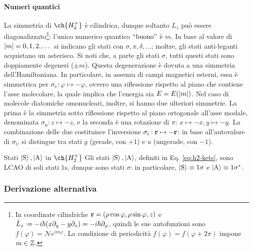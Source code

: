 \paragraph{Numeri quantici}

La simmetria di $ \ch{H_2^+} $ è cilindrica, dunque soltanto $ L_z $ può essere diagonalizzato\footnote{In coordinate cilindriche $ \mathbf{r} = (\rho \cos \varphi, \rho \sin \varphi, z) $ e $ \hat{L}_z \defeq -i\hbar (x \pa_y - y \pa_x) = -i \hbar \pa_\varphi $, quindi le sue autofunzioni sono $ f(\varphi) = \mathcal{N} e^{i m \varphi} $. La condizione di periodicità $ f(\varphi) = f(\varphi + 2\pi) $ impone $ m \in \mathbb{Z} $.}: l'unico numerico quantico $ ``\text{buono}" $ è $ m $. In base al valore di $ \left\lvert m\right\rvert = 0, 1, 2, \dots $ si indicano gli stati con $ \sigma, \pi, \delta, \dots $; inoltre, gli stati anti-leganti acquistano un asterisco. Si noti che, a parte gli stati $ \sigma $, tutti questi stati sono doppiamente degeneri ($ \pm m $). Questa degenerazione è dovuta a una simmetria dell'Hamiltoniana. In particolare, in assenza di campi magnetici esterni, essa è simmetrica per $ \sigma_\text{v} : \varphi \mapsto -\varphi $, ovvero una riflessione rispetto al piano che contiene l'asse molecolare, la quale implica che l'energia sia $ E = E(\left\lvert m\right\rvert) $. Nel caso di molecole diatomiche omonucleari, inoltre, si hanno due ulteriori simmetrie. La prima è la simmetria sotto riflessione rispetto al piano ortogonale all'asse modale, denominata $\sigma_\text{n}: z \mapsto -z$, e la seconda è una rotazione di $\pi$: $x \mapsto -x, y \mapsto -y$. La combinazione delle due costituisce l'inversione $ \sigma_\text{i} : \mathbf{r} \mapsto -\mathbf{r}$: in base all'autovalore di $ \sigma_\text{i} $, si distingue tra stati $ g $ (gerade, con $ +1 $) e $ u $ (ungerade, con $ -1 $).

\begin{example}{Stati $ \ket{\text{S}},\ket{\text{A}} $ in $ \ch{H_2^+} $}{}
	Gli stati $ \ket{\text{S}},\ket{\text{A}} $, definiti in Eq. \ref{eq:h2-kets}, sono LCAO di soli stati $ \text{1s} $, dunque sono stati $ \sigma $: in particolare, $ \ket{\text{S}} \equiv 1\sigma $ e $ \ket{\text{A}} \equiv 1\sigma^* $.
\end{example}



\subsubsection{Derivazione alternativa}

